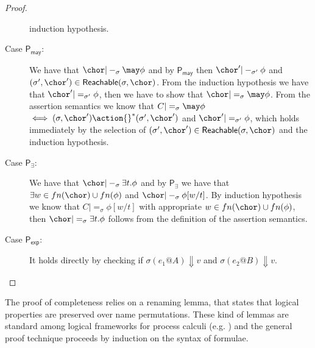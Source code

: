 \begin{proof}
\begin{description}
    induction hypothesis.
  \item[Case $\mathsf{P_{may}}$:] We have that $\chor |-_\sigma \may
    \phi$ and by $\mathsf{P_{may}}$ then $\chor' |-_{\sigma'} \phi$ and
    $(\sigma', \chor') \in \textsf{Reachable}(\sigma, \chor)$. From the
    induction hypothesis we have that $\chor' |=_{\sigma'} \phi$, then
    we have to show that $\chor |=_\sigma \may \phi$. From the
    assertion semantics we know that $C |=_\sigma \may \phi$ $ \iff
    (\sigma, \chor') \action{} ^* (\sigma', \chor')$ and $\chor'
    |=_{\sigma'} \phi$, which holds immediately by the selection of
    $(\sigma', \chor') \in \textsf{Reachable}(\sigma, \chor)$ and the
    induction hypothesis.
  \item[Case $\mathsf{P_{\exists}}$:] We have that $\chor |-_\sigma
    \exists t. \phi$ and by $\mathsf{P_{\exists}}$ we have that
    $\exists w \in fn(\chor) \cup fn(\phi)$ and $\chor |-_\sigma \phi
    [w/t]$. By induction hypothesis we know that $C |=_\sigma \phi
    [w/t]$ with appropriate $w \in fn(\chor) \cup fn(\phi)$, then
    $\chor |=_\sigma \exists t. \phi$ follows from the definition of
    the assertion semantics.
  \item[Case $\mathsf{P_{exp}}$:] It holds directly by checking if
    $\sigma(e_1@A) \Downarrow v$ and $\sigma(e_2@B) \Downarrow
    v$. 
  \end{description}
\end{proof}

The proof of completeness relies on a renaming lemma, that states that
logical properties are preserved over name permutations. These kind of
lemmas are standard among logical frameworks for process calculi
(e.g. \cite{cg:popl00,DBLP:conf/cmsb/MiculanB06}) and the general
  proof technique proceeds by induction on the syntax of formulae.


